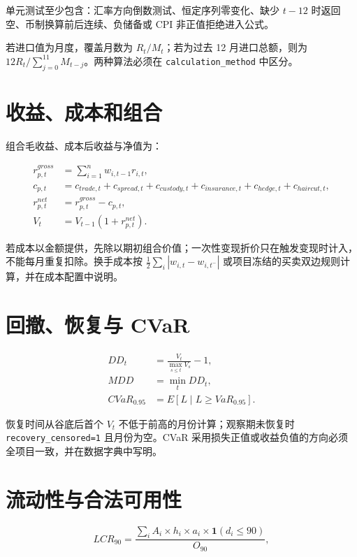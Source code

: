 \documentclass[UTF8,fontset=windows,12pt,openany]{ctexbook}
\newcommand{\Field}[1]{{\small\nolinkurl{#1}}}
\begin{document}
单元测试至少包含：汇率方向倒数测试、恒定序列零变化、缺少 \(t-12\) 时返回空、币制换算前后连续、负储备或 CPI 非正值拒绝进入公式。

若进口值为月度，覆盖月数为 \(R_t/M_t\)；若为过去 12 月进口总额，则为 \(12R_t/\sum_{j=0}^{11}M_{t-j}\)。两种算法必须在 \Field{calculation_method} 中区分。

\section{收益、成本和组合}

组合毛收益、成本后收益与净值为：

\begin{align}
r_{p,t}^{gross} &= \sum_{i=1}^{n} w_{i,t-1}r_{i,t},\\
c_{p,t} &= c_{trade,t}+c_{spread,t}+c_{custody,t}+c_{insurance,t}+c_{hedge,t}+c_{haircut,t},\\
r_{p,t}^{net} &= r_{p,t}^{gross}-c_{p,t},\\
V_t &= V_{t-1}(1+r_{p,t}^{net}).
\end{align}

若成本以金额提供，先除以期初组合价值；一次性变现折价只在触发变现时计入，不能每月重复扣除。换手成本按 \(\frac{1}{2}\sum_i |w_{i,t}-w_{i,t^-}|\) 或项目冻结的买卖双边规则计算，并在成本配置中说明。

\section{回撤、恢复与 CVaR}

\begin{align}
DD_t &= \frac{V_t}{\max_{s\le t}V_s}-1,\\
MDD &= \min_t DD_t,\\
CVaR_{0.95} &= E[L\mid L\ge VaR_{0.95}].
\end{align}

恢复时间从谷底后首个 \(V_t\) 不低于前高的月份计算；观察期未恢复时 \Field{recovery_censored=1} 且月份为空。CVaR 采用损失正值或收益负值的方向必须全项目一致，并在数据字典中写明。

\section{流动性与合法可用性}

\begin{equation}
LCR_{90}=\frac{\sum_i A_i\times h_i\times a_i\times \mathbf{1}(d_i\le90)}{O_{90}},
\end{equation}
\end{document}
